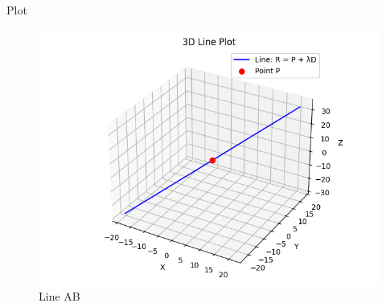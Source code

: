 \documentclass{beamer}
\begin{document}
\begin{frame}{Plot}
\begin{figure}[H]
    \centering
    \includegraphics[width=0.75\linewidth]{Figs/Fig1.png}
    \caption{Line AB}
    \label{fig:fig1}
\end{figure}
\end{frame}
\end{document}
